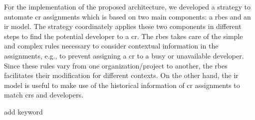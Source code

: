 For the implementation of the proposed architecture, we developed a strategy to
automate \ac{cr} assignments which is based on two main components: a \acf{rbes}
and an \acf{ir} model. The strategy coordinately applies these two components in
different steps to find the potential developer to a \ac{cr}. The \ac{rbes}
takes care of the simple and complex rules necessary to consider contextual
information in the assignments, e.g., to prevent assigning a \ac{cr} to a busy
or unavailable developer. Since these rules vary from one organization/project
to another, the \ac{rbes} facilitates their modification for different contexts.
On the other hand, the \ac{ir} model is useful to make use of the historical
information of \ac{cr} assignments to match \acp{cr} and developers.

\begin{keywords}
add keyword
\end{keywords}